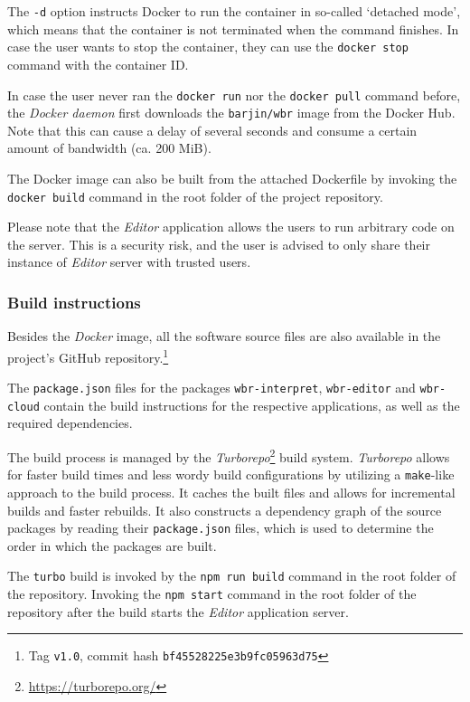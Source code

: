 The \texttt{-d} option instructs Docker to run the container in so-called `detached mode', which means that the container is not terminated when the command finishes. 
In case the user wants to stop the container, they can use the \texttt{docker stop} command with the container ID.

In case the user never ran the \texttt{docker run} nor the \texttt{docker pull} command before, the \textit{Docker daemon} first downloads the \texttt{barjin/wbr} image from the Docker Hub.
Note that this can cause a delay of several seconds and consume a certain amount of bandwidth (ca. 200 MiB).

The Docker image can also be built from the attached Dockerfile by invoking the \texttt{docker build} command in the root folder of the project repository.

Please note that the \textit{Editor} application allows the users to run arbitrary code on the server.
This is a security risk, and the user is advised to only share their instance of \textit{Editor} server with trusted users.

\subsubsection{Build instructions}
Besides the \textit{Docker} image, all the software source files are also available in the project's GitHub repository.\footnote{Tag \texttt{v1.0}, commit hash \texttt{bf45528225e3b9fc05963d75}}

The \texttt{package.json} files for the packages \texttt{wbr-interpret}, \texttt{wbr-editor} and \texttt{wbr-cloud} contain the build instructions for the respective applications,
as well as the required dependencies.


The build process is managed by the \textit{Turborepo}\footnote{\url{https://turborepo.org/}} build system. 
\textit{Turborepo} allows for faster build times and less wordy build configurations by utilizing a \texttt{make}-like approach 
to the build process. It caches the built files and allows for incremental builds and faster rebuilds. 
It also constructs a dependency graph of the source packages by reading their \texttt{package.json} files, which is used to determine the order in which the packages are built.

The \texttt{turbo} build is invoked by the \texttt{npm run build} command in the root folder of the repository.
Invoking the \texttt{npm start} command in the root folder of the repository after the build starts the \textit{Editor} application server.